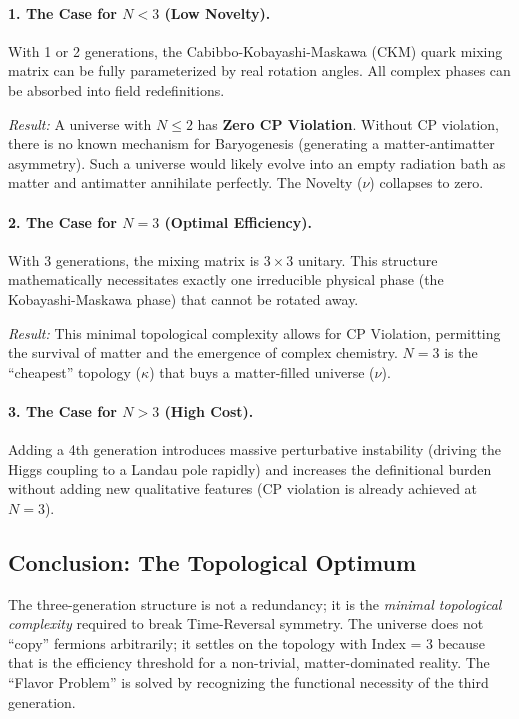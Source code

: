 \documentclass[12pt,a4paper]{article}
\theoremstyle{definition}
\newcommand{\kap}{\kappa}
\begin{document}
\paragraph{1. The Case for $N < 3$ (Low Novelty).}
With 1 or 2 generations, the Cabibbo-Kobayashi-Maskawa (CKM) quark mixing matrix can be fully parameterized by real rotation angles. All complex phases can be absorbed into field redefinitions.

\emph{Result:} A universe with $N \le 2$ has \textbf{Zero CP Violation}. Without CP violation, there is no known mechanism for Baryogenesis (generating a matter-antimatter asymmetry). Such a universe would likely evolve into an empty radiation bath as matter and antimatter annihilate perfectly. The Novelty ($\nu$) collapses to zero.

\paragraph{2. The Case for $N = 3$ (Optimal Efficiency).}
With 3 generations, the mixing matrix is $3 \times 3$ unitary. This structure mathematically necessitates exactly one irreducible physical phase (the Kobayashi-Maskawa phase) that cannot be rotated away.

\emph{Result:} This minimal topological complexity allows for CP Violation, permitting the survival of matter and the emergence of complex chemistry. $N=3$ is the ``cheapest'' topology ($\kap$) that buys a matter-filled universe ($\nu$).

\paragraph{3. The Case for $N > 3$ (High Cost).}
Adding a 4th generation introduces massive perturbative instability (driving the Higgs coupling to a Landau pole rapidly) and increases the definitional burden without adding new qualitative features (CP violation is already achieved at $N=3$).

\subsection{Conclusion: The Topological Optimum}

The three-generation structure is not a redundancy; it is the \emph{minimal topological complexity} required to break Time-Reversal symmetry. The universe does not ``copy'' fermions arbitrarily; it settles on the topology with Index = 3 because that is the efficiency threshold for a non-trivial, matter-dominated reality. The ``Flavor Problem'' is solved by recognizing the functional necessity of the third generation.
\end{document}
